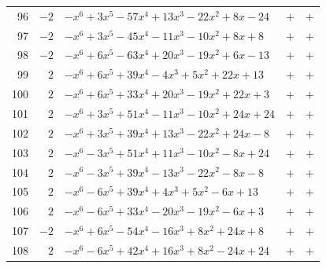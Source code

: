 \documentclass[11pt]{article}
\begin{document}
\begin{longtable}{@{}rrlcc@{}}
96 & $-2$ & $-x^{6}+3x^{5}-57x^{4}+13x^{3}-22x^{2}+8x-24$ & $+$ & $+$\\
97 & $-2$ & $-x^{6}+3x^{5}-45x^{4}-11x^{3}-10x^{2}+8x+8$ & $+$ & $+$\\
98 & $-2$ & $-x^{6}+6x^{5}-63x^{4}+20x^{3}-19x^{2}+6x-13$ & $+$ & $+$\\
99 & $2$ & $-x^{6}+6x^{5}+39x^{4}-4x^{3}+5x^{2}+22x+13$ & $+$ & $+$\\
100 & $2$ & $-x^{6}+6x^{5}+33x^{4}+20x^{3}-19x^{2}+22x+3$ & $+$ & $+$\\
101 & $2$ & $-x^{6}+3x^{5}+51x^{4}-11x^{3}-10x^{2}+24x+24$ & $+$ & $+$\\
102 & $2$ & $-x^{6}+3x^{5}+39x^{4}+13x^{3}-22x^{2}+24x-8$ & $+$ & $+$\\
103 & $2$ & $-x^{6}-3x^{5}+51x^{4}+11x^{3}-10x^{2}-8x+24$ & $+$ & $+$\\
104 & $2$ & $-x^{6}-3x^{5}+39x^{4}-13x^{3}-22x^{2}-8x-8$ & $+$ & $+$\\
105 & $2$ & $-x^{6}-6x^{5}+39x^{4}+4x^{3}+5x^{2}-6x+13$ & $+$ & $+$\\
106 & $2$ & $-x^{6}-6x^{5}+33x^{4}-20x^{3}-19x^{2}-6x+3$ & $+$ & $+$\\
107 & $-2$ & $-x^{6}+6x^{5}-54x^{4}-16x^{3}+8x^{2}+24x+8$ & $+$ & $+$\\
108 & $2$ & $-x^{6}-6x^{5}+42x^{4}+16x^{3}+8x^{2}-24x+24$ & $+$ & $+$\\
\end{longtable}
\endgroup
\end{document}
